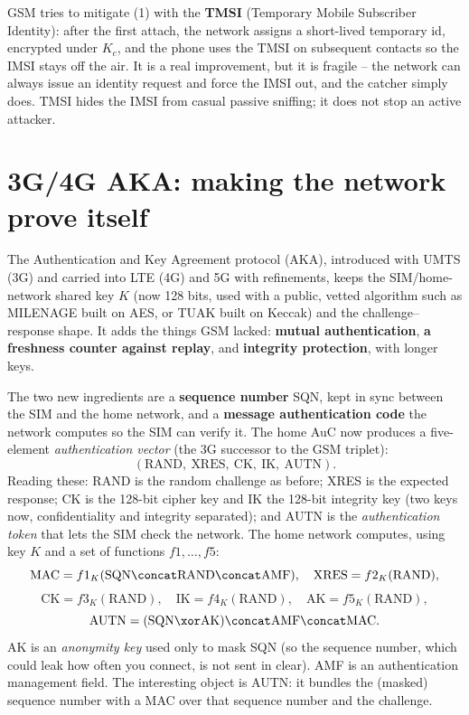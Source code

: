 GSM tries to mitigate (1) with the \textbf{TMSI} (Temporary Mobile Subscriber Identity): after the first attach, the network assigns a short-lived temporary id, encrypted under $K_c$, and the phone uses the TMSI on subsequent contacts so the IMSI stays off the air. It is a real improvement, but it is fragile -- the network can always issue an identity request and force the IMSI out, and the catcher simply does. TMSI hides the IMSI from casual passive sniffing; it does not stop an active attacker.

\section{3G/4G AKA: making the network prove itself}
\label{ch29:aka}

The Authentication and Key Agreement protocol (AKA), introduced with UMTS (3G) and carried into LTE (4G) and 5G with refinements, keeps the SIM/home-network shared key $K$ (now 128 bits, used with a public, vetted algorithm such as MILENAGE built on AES, or TUAK built on Keccak) and the challenge--response shape. It adds the things GSM lacked: \textbf{mutual authentication}, \textbf{a freshness counter against replay}, and \textbf{integrity protection}, with longer keys.

The two new ingredients are a \textbf{sequence number} SQN, kept in sync between the SIM and the home network, and a \textbf{message authentication code} the network computes so the SIM can verify it. The home AuC now produces a five-element \emph{authentication vector} (the 3G successor to the GSM triplet):
\[
  (\text{RAND},\ \text{XRES},\ \text{CK},\ \text{IK},\ \text{AUTN}).
\]
Reading these: RAND is the random challenge as before; XRES is the expected response; CK is the 128-bit cipher key and IK the 128-bit integrity key (two keys now, confidentiality and integrity separated); and AUTN is the \emph{authentication token} that lets the SIM check the network. The home network computes, using key $K$ and a set of functions $f1,\dots,f5$:
\[
  \text{MAC} = f1_K(\text{SQN}\concat\text{RAND}\concat\text{AMF}),\quad
  \text{XRES}=f2_K(\text{RAND}),
\]
\[
  \text{CK}=f3_K(\text{RAND}),\quad \text{IK}=f4_K(\text{RAND}),\quad \text{AK}=f5_K(\text{RAND}),
\]
\[
  \text{AUTN} = (\text{SQN}\xor\text{AK})\concat\text{AMF}\concat\text{MAC}.
\]
AK is an \emph{anonymity key} used only to mask SQN (so the sequence number, which could leak how often you connect, is not sent in clear). AMF is an authentication management field. The interesting object is AUTN: it bundles the (masked) sequence number with a MAC over that sequence number and the challenge.

